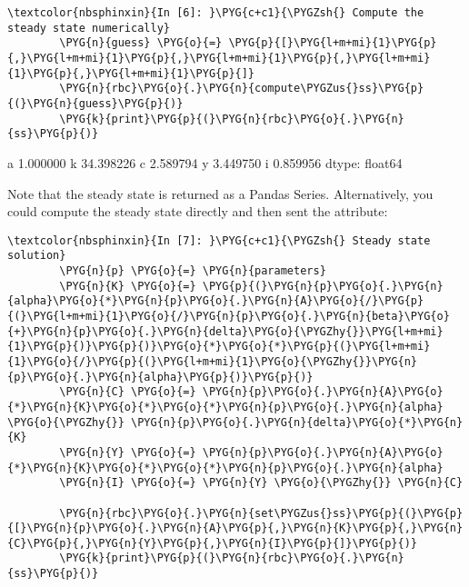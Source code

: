 \documentclass[letterpaper,10pt,openany,oneside,english]{sphinxmanual}
\begin{document}
\begin{Verbatim}[commandchars=\\\{\}]
\textcolor{nbsphinxin}{In [6]: }\PYG{c+c1}{\PYGZsh{} Compute the steady state numerically}
        \PYG{n}{guess} \PYG{o}{=} \PYG{p}{[}\PYG{l+m+mi}{1}\PYG{p}{,}\PYG{l+m+mi}{1}\PYG{p}{,}\PYG{l+m+mi}{1}\PYG{p}{,}\PYG{l+m+mi}{1}\PYG{p}{,}\PYG{l+m+mi}{1}\PYG{p}{]}
        \PYG{n}{rbc}\PYG{o}{.}\PYG{n}{compute\PYGZus{}ss}\PYG{p}{(}\PYG{n}{guess}\PYG{p}{)}
        \PYG{k}{print}\PYG{p}{(}\PYG{n}{rbc}\PYG{o}{.}\PYG{n}{ss}\PYG{p}{)}
\end{Verbatim}
\begin{OriginalVerbatim}[commandchars=\\\{\}]
a     1.000000
k    34.398226
c     2.589794
y     3.449750
i     0.859956
dtype: float64
\end{OriginalVerbatim}
Note that the steady state is returned as a Pandas Series.
Alternatively, you could compute the steady state directly and then sent
the  attribute:

\begin{Verbatim}[commandchars=\\\{\}]
\textcolor{nbsphinxin}{In [7]: }\PYG{c+c1}{\PYGZsh{} Steady state solution}
        \PYG{n}{p} \PYG{o}{=} \PYG{n}{parameters}
        \PYG{n}{K} \PYG{o}{=} \PYG{p}{(}\PYG{n}{p}\PYG{o}{.}\PYG{n}{alpha}\PYG{o}{*}\PYG{n}{p}\PYG{o}{.}\PYG{n}{A}\PYG{o}{/}\PYG{p}{(}\PYG{l+m+mi}{1}\PYG{o}{/}\PYG{n}{p}\PYG{o}{.}\PYG{n}{beta}\PYG{o}{+}\PYG{n}{p}\PYG{o}{.}\PYG{n}{delta}\PYG{o}{\PYGZhy{}}\PYG{l+m+mi}{1}\PYG{p}{)}\PYG{p}{)}\PYG{o}{*}\PYG{o}{*}\PYG{p}{(}\PYG{l+m+mi}{1}\PYG{o}{/}\PYG{p}{(}\PYG{l+m+mi}{1}\PYG{o}{\PYGZhy{}}\PYG{n}{p}\PYG{o}{.}\PYG{n}{alpha}\PYG{p}{)}\PYG{p}{)}
        \PYG{n}{C} \PYG{o}{=} \PYG{n}{p}\PYG{o}{.}\PYG{n}{A}\PYG{o}{*}\PYG{n}{K}\PYG{o}{*}\PYG{o}{*}\PYG{n}{p}\PYG{o}{.}\PYG{n}{alpha} \PYG{o}{\PYGZhy{}} \PYG{n}{p}\PYG{o}{.}\PYG{n}{delta}\PYG{o}{*}\PYG{n}{K}
        \PYG{n}{Y} \PYG{o}{=} \PYG{n}{p}\PYG{o}{.}\PYG{n}{A}\PYG{o}{*}\PYG{n}{K}\PYG{o}{*}\PYG{o}{*}\PYG{n}{p}\PYG{o}{.}\PYG{n}{alpha}
        \PYG{n}{I} \PYG{o}{=} \PYG{n}{Y} \PYG{o}{\PYGZhy{}} \PYG{n}{C}
        
        \PYG{n}{rbc}\PYG{o}{.}\PYG{n}{set\PYGZus{}ss}\PYG{p}{(}\PYG{p}{[}\PYG{n}{p}\PYG{o}{.}\PYG{n}{A}\PYG{p}{,}\PYG{n}{K}\PYG{p}{,}\PYG{n}{C}\PYG{p}{,}\PYG{n}{Y}\PYG{p}{,}\PYG{n}{I}\PYG{p}{]}\PYG{p}{)}
        \PYG{k}{print}\PYG{p}{(}\PYG{n}{rbc}\PYG{o}{.}\PYG{n}{ss}\PYG{p}{)}
\end{Verbatim}
\begin{OriginalVerbatim}[commandchars=\\\{\}]
[  1.          34.39822605   2.58979429   3.44974994   0.85995565]
\end{OriginalVerbatim}
\end{document}
